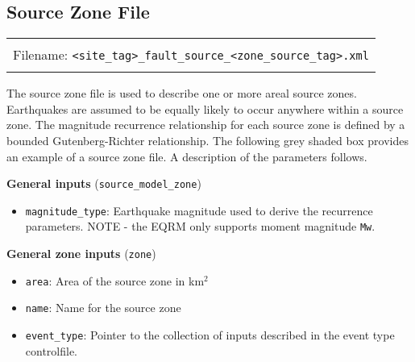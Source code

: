 \subsection{Source Zone File}
\label{sec:source-zone-file}

\begin{center}
\begin{tabular}{|c|}
\hline
 \\
Filename: \texttt{<site\_tag>\_}\texttt{fault\_source\_}\texttt{<zone\_source\_tag>}\texttt{.xml}  \\
\\
\hline
\end{tabular} 
\end{center}

The source zone file is used to describe one or more areal source
zones. Earthquakes are assumed to be equally likely to occur
anywhere within a source zone. The magnitude recurrence relationship
for each source zone is defined by a bounded Gutenberg-Richter
relationship. The following grey shaded box provides an example of a
source zone file. A description of the parameters follows.


\textbf{General inputs} (\texttt{source\_model\_zone})
\begin{itemize}
\item \texttt{magnitude\_type}: Earthquake magnitude used to derive the
recurrence parameters. NOTE - the EQRM only supports moment magnitude
\texttt{Mw}.
\end{itemize}

\textbf{General zone inputs} (\texttt{zone})
\begin{itemize}
\item \texttt{area}: Area of the source zone in km$^2$ 
\item \texttt{name}: Name for the source zone 
\item \texttt{event\_type}: Pointer to the collection of inputs described in the
event type controlfile.
\end{itemize}

